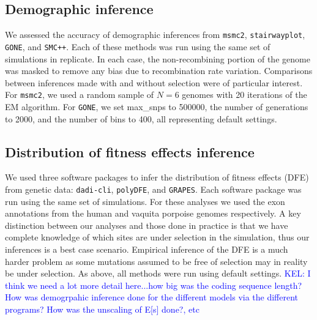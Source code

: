 \documentclass[hidelinks]{article}
\newcommand{\msmc}{\texttt{msmc2}\xspace}
\newcommand{\stairway}{\texttt{stairwayplot}\xspace}
\newcommand{\gone}{\texttt{GONE}\xspace}
\newcommand{\smcpp}{\texttt{SMC++}\xspace}
\newcommand{\polydfe}{\texttt{polyDFE}\xspace}
\newcommand{\dadicli}{\texttt{dadi-cli}\xspace}
\newcommand{\grapes}{\texttt{GRAPES}\xspace}
\newcommand{\kelcomment}[1]{\textcolor{blue}{KEL: #1}}
\begin{document}
    \subsection*{Demographic inference}
    We assessed the accuracy of demographic inferences from
    \msmc \citep{Schiffels2020}, \stairway \citep{liu2020stairway}, \gone \citep{santiago2020recent}, and \smcpp \citep{terhorst2017robust}.
    Each of these methods was run using the same set of simulations in replicate.
    In each case, the non-recombining portion
    of the genome was masked to remove any bias due to recombination rate %
    variation. Comparisons between inferences made with and without selection were 
    of particular interest. For \msmc, we used a random sample of $N=6$ genomes with 20
    iterations of the EM algorithm. For \gone, we set max\_snps to 500000,
    the number of generations to 2000, and the number of bins to 400, all representing default settings.
    

    \subsection*{Distribution of fitness effects inference}
    We used three software packages to infer the distribution of fitness effects (DFE) from genetic data:
    \dadicli \citep{Huang2023,kim2017inference}, \polydfe \citep{tataru2020polydfe}, and \grapes \citep{galtier2016adaptive}.
    Each software package was run using the same set of simulations.
    For these analyses we used the exon annotations from the human and vaquita porpoise genomes respectively.
    A key distinction between our analyses and those done in practice
    is that we have complete knowledge of which sites are under selection in the simulation,
    thus our inferences is a best case scenario. Empirical inference of the DFE is a much
    harder problem as some mutations assumed to be free of selection
    may in reality be under selection. As above, all methods were run using default settings.
    \kelcomment{I think we need a lot more detail here...how big was the coding sequence length? How was demogrpahic inference done for the different models via the different programs? How was the unscaling of E[s] done?, etc}
\end{document}

